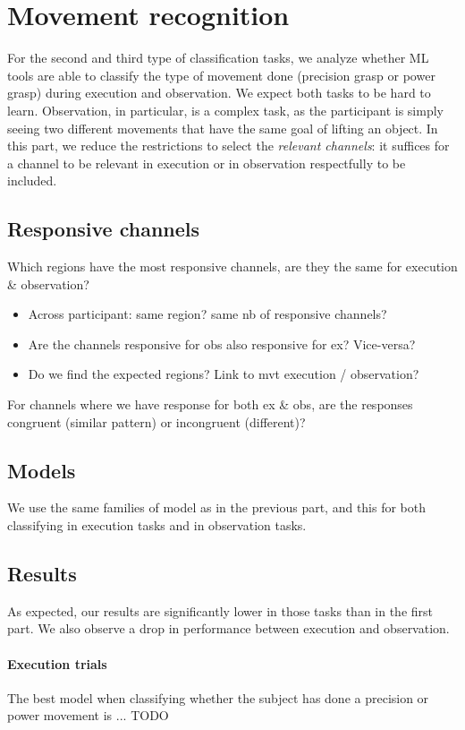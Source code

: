 \documentclass[10pt,conference,compsocconf]{IEEEtran}
\begin{document}
\section{Movement recognition}
\label{sec:objectrecognition}
For the second and third type of classification tasks, we analyze whether ML tools are able to classify the type of movement done (precision grasp or power grasp) during execution and observation. We expect both tasks to be hard to learn. Observation, in particular, is a complex task, as the participant is simply seeing two different movements that have the same goal of lifting an object. In this part, we reduce the restrictions to select the \textit{relevant channels}: it suffices for a channel to be relevant in execution or in observation respectfully to be included.

\subsection{Responsive channels}
Which regions have the most responsive channels, are they the same for execution \& observation?

\begin{itemize}
    \item Across participant: same region? same nb of responsive channels?
    \item Are the channels responsive for obs also responsive for ex? Vice-versa?
    \item Do we find the expected regions? Link to mvt execution / observation?
\end{itemize}

For channels where we have response for both ex \& obs, are the responses congruent (similar pattern) or incongruent (different)?

\subsection{Models}
We use the same families of model as in the previous part, and this for both classifying in execution tasks and in observation tasks.

\subsection{Results}
As expected, our results are significantly lower in those tasks than in the first part. We also observe a drop in performance between execution and observation.

\paragraph{Execution trials}
The best model when classifying whether the subject has done a precision or power movement is ... TODO
\end{document}
